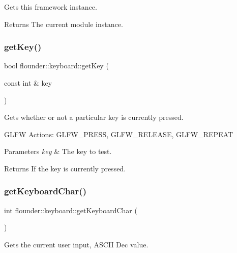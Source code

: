 Gets this framework instance. 

\begin{DoxyReturn}{Returns}
The current module instance. 
\end{DoxyReturn}
\mbox{\label{classflounder_1_1keyboard_a0138ab3a7770eae57039618cb8d54992}} 
\subsubsection{\texorpdfstring{get\+Key()}{getKey()}}
{\footnotesize\ttfamily bool flounder\+::keyboard\+::get\+Key (\begin{DoxyParamCaption}\item[{const int \&}]{key }\end{DoxyParamCaption})}



Gets whether or not a particular key is currently pressed. 

G\+L\+FW Actions\+: G\+L\+F\+W\+\_\+\+P\+R\+E\+SS, G\+L\+F\+W\+\_\+\+R\+E\+L\+E\+A\+SE, G\+L\+F\+W\+\_\+\+R\+E\+P\+E\+AT


\begin{DoxyParams}{Parameters}
{\em key} & The key to test. \\
\hline
\end{DoxyParams}
\begin{DoxyReturn}{Returns}
If the key is currently pressed. 
\end{DoxyReturn}
\mbox{\label{classflounder_1_1keyboard_ad941be3ae52b1c60437695d8faf1b6d7}} 
\subsubsection{\texorpdfstring{get\+Keyboard\+Char()}{getKeyboardChar()}}
{\footnotesize\ttfamily int flounder\+::keyboard\+::get\+Keyboard\+Char (\begin{DoxyParamCaption}{ }\end{DoxyParamCaption})}



Gets the current user input, A\+S\+C\+II Dec value. 

